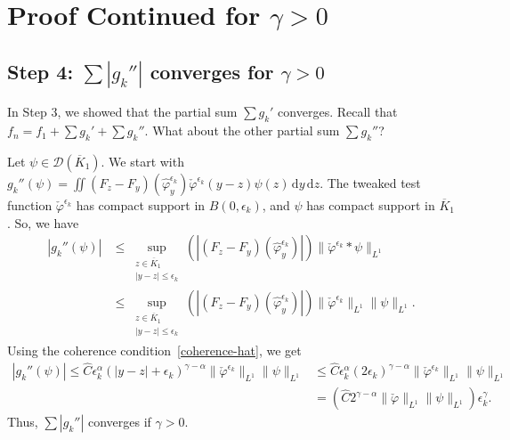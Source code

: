 
\chapter{Proof Continued for \texorpdfstring{\(\gamma > 0\)}{gamma > 0}}\label{chapter:proof-gamma-positive}

\section{Step 4: \texorpdfstring{\(\sum |g_k''|\) converges for \(\gamma > 0\)}{sum g''k converges for gamma > 0}}\label{step4}

In Step 3, we showed that the partial sum \( \sum g_k' \) converges. Recall that \(f_n = f_1 + \sum g_k' + \sum g_k''\). What about the other partial sum \( \sum g_k'' \)?

Let \(\psi \in \mathcal{D}(\overline K_1)\). We start with \(g_k''(\psi) = \iint (F_z - F_y)(\hat{\varphi}^{\epsilon_k}_{y}) \check \varphi^{\epsilon_k}(y-z) \psi(z) \, \mathrm{d}y \, \mathrm{d}z\). The tweaked test function \(\check \varphi^{\epsilon_k}\) has compact support in \(B(0,\epsilon_k)\), and \(\psi\) has compact support in \(\overline K_1\). So, we have 
\begin{align*}
    |g_k''(\psi)| 
    &\leq \sup_{\substack{z \in \overline{K}_1 \\ |y-z|\leq \epsilon_k}}
    \left( |(F_z -F_y)(\hat \varphi^{\epsilon_k}_y)| \right) \lVert \check \varphi^{\epsilon_k} * \psi \rVert_{L^1}\\
    &\leq \sup_{\substack{z \in \overline{K}_1 \\ |y-z|\leq \epsilon_k}}
    \left( |(F_z -F_y)(\hat \varphi^{\epsilon_k}_y)| \right) \lVert \check \varphi^{\epsilon_k} \rVert_{L^1} \lVert \psi \rVert_{L^1}.
\end{align*}
Using the coherence condition~\eqref{coherence-hat}, we get
\begin{align}
    |g_k''(\psi)| 
    \leq \hat C \epsilon_k^\alpha (|y-z| + \epsilon_k)^{\gamma - \alpha} \lVert \check \varphi^{\epsilon_k} \rVert_{L^1} \lVert \psi \rVert_{L^1}
    &\leq \hat C \epsilon_k^\alpha (2\epsilon_k)^{\gamma - \alpha} \lVert \check \varphi^{\epsilon_k} \rVert_{L^1} \lVert \psi \rVert_{L^1}\nonumber\\
    &= \left(\hat C  2^{\gamma - \alpha} \lVert \check \varphi \rVert_{L^1} \lVert \psi \rVert_{L^1}\right) \epsilon_k^\gamma. \label{Mustermaus}
\end{align}
Thus, \(\sum |g_k''|\) converges if \(\gamma > 0\).

